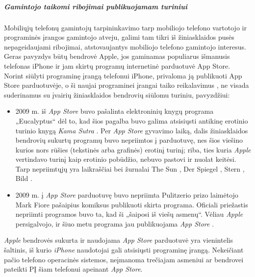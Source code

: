 \documentclass[kursinis-darbas]{vukf}
\begin{document}
\subparagraph{Gamintojo taikomi ribojimai publikuojamam turiniui}

Mobiliųjų telefonų gamintojų tarpininkavimo tarp mobiliojo telefono vartotojo ir programinės įrangos gamintojo atveju, galimi tam tikri iš žiniasklaidos pusės nepageidaujami ribojimai, atstovaujantys mobiliojo telefono gamintojo interesus. Geras pavyzdys būtų bendrovė Apple, jos gaminamas populiarus išmanusis telefonas iPhone ir jam skirtų programų internetinė parduotuvė App Store. Norint siūlyti programinę įrangą telefonui iPhone, privaloma ją publikuoti App Store parduotuvėje, o ši naujai programinei įrangai taiko reikalavimus \cite{apple_iphone_developer_program_license_agreement}, ne visada suderinamus su įvairių žiniasklaidos bendrovių siūlomu turiniu, pavyzdžiui:

\begin{itemize}
	\item 2009 m. iš \emph{App Store} buvo pašalinta elektroninių knygų programa „Eucalyptus“ dėl to, kad šios pagalba buvo galima atsisiųsti antikinę erotinio turinio knygą \emph{Kama Sutra} \cite{guardian_apple_backtracks_on_iphone_sex_ban}. Per \emph{App Store} gyvavimo laiką, dalis žiniasklaidos bendrovių sukurtų programų buvo nepriimtos į parduotuvę, nes šios viešino kurios nors rūšies (tekstinės arba grafinės) erotinį turinį; riba, ties kuria \emph{Apple} vertindavo turinį kaip erotinio pobūdžio, nebuvo pastovi ir nuolat keitėsi. Tarp nepriimtųjų yra laikraščiai bei žurnalai The Sun \cite{guardian_the_suns_obscene_page_3_girls_get_iphone_newspaper_app_banned_by_apple}, Der Spiegel \cite{nytimes_publishers_question_apples_rejection_of_nudity}, Stern \cite{nytimes_publishers_question_apples_rejection_of_nudity}, Bild \cite{guardian_german_publisher_in_row_with_apple_over_pin_ups_in_iphone_app}.
	\item 2009 m. į \emph{App Store} parduotuvę buvo nepriimta Pulitzerio prizo laimėtojo Mark Fiore pašaipius komiksus publikuoti skirta programa. Oficiali priežastis nepriimti programos buvo ta, kad ši „šaiposi iš viešų asmenų“. Vėliau \emph{Apple} persigalvojo, ir šiuo metu programa jau publikuojama \emph{App Store} \cite{nytimes_a_pulitzer_winner_gets_apples_reconsideration}.
\end{itemize}

\emph{Apple} bendrovės sukurta ir naudojama \emph{App Store} parduotuvė yra vienintelis šaltinis, iš kurio \emph{iPhone} naudotojai gali atsisiųsti programinę įrangą. Nekeičiant pačio telefono operacinės sistemos, neįmanoma trečiajam asmeniui ar bendrovei pateikti PĮ šiam telefonui apeinant \emph{App Store}.
\end{document}
